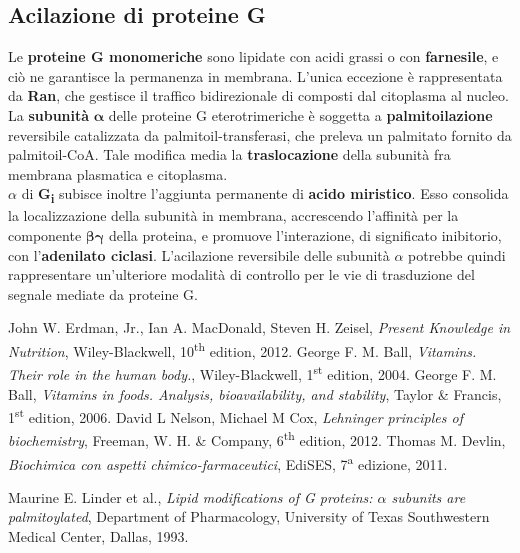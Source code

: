 \documentclass[a4paper, 12pt]{article}
\begin{document}
\subsection{Acilazione di proteine G}
Le \textbf{proteine G monomeriche} sono lipidate con acidi grassi o con \textbf{farnesile}, e ciò ne garantisce la permanenza in membrana. L'unica eccezione è rappresentata da \textbf{Ran}, che gestisce il traffico bidirezionale di composti dal citoplasma al nucleo.\\
La \textbf{subunità} $\boldsymbol\alpha$ delle proteine G eterotrimeriche è soggetta a \textbf{palmitoilazione} reversibile catalizzata da palmitoil-transferasi, che preleva un palmitato fornito da palmitoil-CoA. Tale modifica media la \textbf{traslocazione} della subunità fra membrana plasmatica e citoplasma.\\
$\alpha$ di \textbf{G\textsubscript{i}} subisce inoltre l'aggiunta permanente di \textbf{acido miristico}. Esso consolida la localizzazione della subunità in membrana, accrescendo l'affinità per la componente $\boldsymbol{\beta\gamma}$ della proteina, e promuove l'interazione, di significato inibitorio, con l'\textbf{adenilato ciclasi}.
L'acilazione reversibile delle subunità $\alpha$ potrebbe quindi rappresentare un'ulteriore modalità di controllo per le vie di trasduzione del segnale mediate da proteine G.

\begin{thebibliography}{9}

  John W. Erdman, Jr., Ian A. MacDonald, Steven H. Zeisel,
  \textit{Present Knowledge in Nutrition},
  Wiley-Blackwell,
  10\textsuperscript{th} edition,
  2012.
  George F. M. Ball,
  \textit{Vitamins. Their role in the human body.},
  Wiley-Blackwell,
  1\textsuperscript{st} edition,
  2004.
  George F. M. Ball,
  \textit{Vitamins in foods. Analysis, bioavailability, and stability},
  Taylor & Francis,
  1\textsuperscript{st} edition,
  2006.
  David L Nelson, Michael M Cox,
  \textit{Lehninger principles of biochemistry},
  Freeman, W. H. & Company,
  6\textsuperscript{th} edition,
  2012.
  Thomas M. Devlin,
  \textit{Biochimica con aspetti chimico-farmaceutici},
  EdiSES,
  7\textsuperscript{a} edizione,
  2011.

  Maurine E. Linder et al.,
  \textit{Lipid modifications of G proteins: $\alpha$ subunits are palmitoylated},
  Department of Pharmacology, University of Texas Southwestern Medical Center, Dallas,
  1993.

\end{thebibliography}
\end{document}
